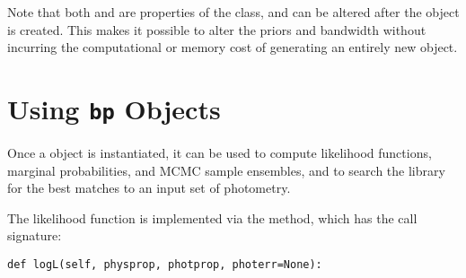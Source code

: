 \documentclass[letterpaper,10pt,english]{sphinxmanual}
\begin{document}
Note that both  and  are properties of the  class, and can be altered after the  object is created. This makes it possible to alter the priors and bandwidth without incurring the computational or memory cost of generating an entirely new  object.


\section{Using \texttt{bp} Objects}
\label{bayesphot:using-bp-objects}
Once a  object is instantiated, it can be used to compute likelihood functions, marginal probabilities, and MCMC sample ensembles, and to search the library for the best matches to an input set of photometry.

The likelihood function is implemented via the  method, which has the call signature:

\begin{Verbatim}[commandchars=\\\{\}]
def logL(self, physprop, photprop, photerr=None):
\end{Verbatim}
\end{document}
